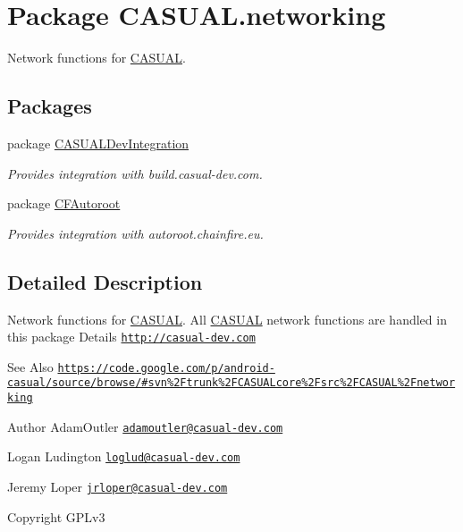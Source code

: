 \hypertarget{namespaceCASUAL_1_1networking}{\section{Package C\-A\-S\-U\-A\-L.\-networking}
\label{namespaceCASUAL_1_1networking}
}


Network functions for \hyperlink{namespaceCASUAL}{C\-A\-S\-U\-A\-L}.  


\subsection*{Packages}
\begin{DoxyCompactItemize}
\item 
package \hyperlink{namespaceCASUAL_1_1networking_1_1CASUALDevIntegration}{C\-A\-S\-U\-A\-L\-Dev\-Integration}
\begin{DoxyCompactList}\small\item\em Provides integration with build.\-casual-\/dev.\-com. \end{DoxyCompactList}\item 
package \hyperlink{namespaceCASUAL_1_1networking_1_1CFAutoroot}{C\-F\-Autoroot}
\begin{DoxyCompactList}\small\item\em Provides integration with autoroot.\-chainfire.\-eu. \end{DoxyCompactList}\end{DoxyCompactItemize}


\subsection{Detailed Description}
Network functions for \hyperlink{namespaceCASUAL}{C\-A\-S\-U\-A\-L}. All \hyperlink{namespaceCASUAL}{C\-A\-S\-U\-A\-L} network functions are handled in this package Details \href{http://casual-dev.com}{\tt http\-://casual-\/dev.\-com} \begin{DoxySeeAlso}{See Also}
\href{https://code.google.com/p/android-casual/source/browse/#svn%2Ftrunk%2FCASUALcore%2Fsrc%2FCASUAL%2Fnetworking}{\tt https\-://code.\-google.\-com/p/android-\/casual/source/browse/\#svn\%2\-Ftrunk\%2\-F\-C\-A\-S\-U\-A\-Lcore\%2\-Fsrc\%2\-F\-C\-A\-S\-U\-A\-L\%2\-Fnetworking} 
\end{DoxySeeAlso}
\begin{DoxyAuthor}{Author}
Adam\-Outler \href{mailto:adamoutler@casual-dev.com}{\tt adamoutler@casual-\/dev.\-com} 

Logan Ludington \href{mailto:loglud@casual-dev.com}{\tt loglud@casual-\/dev.\-com} 

Jeremy Loper \href{mailto:jrloper@casual-dev.com}{\tt jrloper@casual-\/dev.\-com} 
\end{DoxyAuthor}
\begin{DoxyCopyright}{Copyright}
G\-P\-Lv3 
\end{DoxyCopyright}
